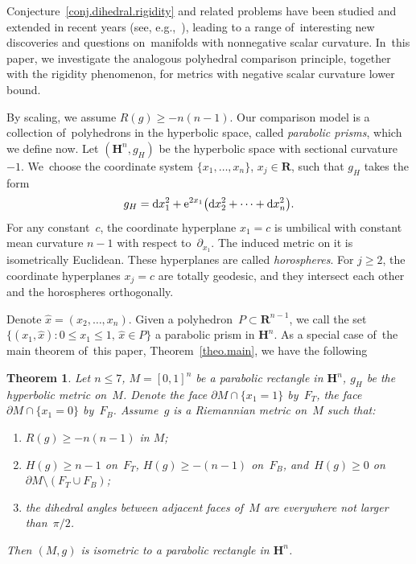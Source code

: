 \documentclass[pdftex]{sigma}
\numberwithin{equation}{section}
\newtheorem{theo}[prop]{Theorem}
\theoremstyle{definition}
\newcommand{\HH}{\mathbf{H}}
\newcommand{\RR}{\mathbf{R}}
\begin{document}
Conjecture~\ref{conj.dihedral.rigidity} and related problems have been studied and extended in recent years (see, e.g.,~\cite{Gromov2018Metric,gromov2018IAS,gromov2019lectures,Li2017polyhedron,li2019dihedral,LiMantoulidis2018positive,miao2019measuring}), leading to a range of~interesting new discoveries and questions on~manifolds with nonnegative scalar curvature. In~this paper, we investigate the analogous polyhedral comparison principle, together with the rigidity phenomenon, for metrics with nega\-tive scalar curvature lower bound.

By scaling, we assume $R(g)\ge -n(n-1)$. Our comparison model is a collection of~polyhedrons in the hyperbolic space, called \textit{parabolic prisms}, which we define now. Let $(\HH^n,g_H)$ be the hyperbolic space with sectional curvature $-1$. We~choose the coordinate system $\{x_1,\dots,x_n\}$, $x_j\in \RR$, such that $g_H$ takes the form
\[g_H={\rm d}x_1^2+{\rm e}^{2x_1}\big({\rm d}x_2^2+\cdots+{\rm d}x_n^2\big).\]
For any constant~$c$, the coordinate hyperplane $x_1=c$ is umbilical with constant mean curvature $n-1$ with respect to~$\partial_{x_1}$. The induced metric on it is isometrically Euclidean. These hyperplanes are called \textit{horospheres}. For $j\ge 2$, the coordinate hyperplanes $x_j=c$ are totally geodesic, and they intersect each other and the horospheres orthogonally.

Denote $\hat{x}=(x_2,\dots,x_n)$. Given a polyhedron~$P\subset \RR^{n-1}$, we call the set $\{(x_1,\hat{x})\colon 0\le x_1\le 1,\, \hat{x}\in P\}$ a parabolic prism in $\HH^n$. As a special case of~the main theorem of~this paper, Theorem~\ref{theo.main}, we have the following
\begin{theo}\label{theo.parabolic.cube}
Let $n\le 7$, $M=[0,1]^n$ be a parabolic rectangle in $\HH^n$, $g_H$ be the hyperbolic metric on~$M$. Denote the face $\partial M\cap \{x_1=1\}$ by~$F_T$, the face $\partial M\cap \{x_1=0\}$ by~$F_B$. Assume~$g$ is a Riemannian metric on~$M$ such that:
\begin{enumerate}\itemsep=0pt
\item[${\rm 1)}$] $R(g)\ge -n(n-1)$ in $M$;
\item[${\rm 2)}$] $H(g)\ge n-1$ on~$F_T$, $H(g)\ge -(n-1)$ on~$F_B$, and~$H(g)\ge 0$ on~$\partial M\setminus (F_T\cup F_B)$;
\item[${\rm 3)}$] the dihedral angles between adjacent faces of~$M$ are everywhere not larger than~$\pi/2$.
\end{enumerate}
Then $(M,g)$ is isometric to a parabolic rectangle in $\HH^n$.
\end{theo}
\end{document}
